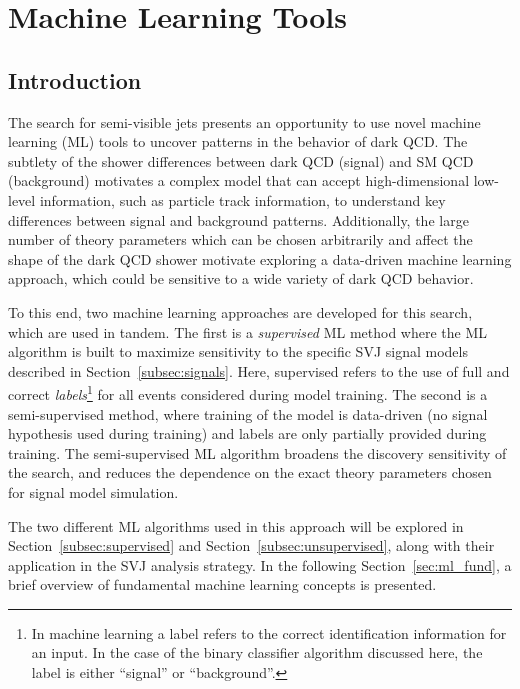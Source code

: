 \chapter{Machine Learning Tools}
\label{ch:ml_tools}

\section{Introduction}
The search for semi-visible jets presents an opportunity to use novel machine learning (ML) tools to uncover patterns in the behavior of dark QCD. The subtlety of the shower differences between dark QCD (signal) and SM QCD (background) motivates a complex model that can accept high-dimensional low-level information, such as particle track information, to understand key differences between signal and background patterns. Additionally, the large number of theory parameters which can be chosen arbitrarily and affect the shape of the dark QCD shower motivate exploring a data-driven machine learning approach, which could be sensitive to a wide variety of dark QCD behavior. \par

To this end, two machine learning approaches are developed for this search, which are used in tandem. The first is a \textit{supervised} ML method where the ML algorithm is built to maximize sensitivity to the specific SVJ signal models described in Section~\ref{subsec:signals}. Here, supervised refers to the use of full and correct \textit{labels}\footnote{In machine learning a label refers to the correct identification information for an input. In the case of the binary classifier algorithm discussed here, the label is either ``signal'' or ``background''.} for all events considered during model training. The second is a semi-supervised method, where training of the model is data-driven (no signal hypothesis used during training) and labels are only partially provided during training. The semi-supervised ML algorithm broadens the discovery sensitivity of the search, and reduces the dependence on the exact theory parameters chosen for signal model simulation. \par

The two different ML algorithms used in this approach will be explored in Section~\ref{subsec:supervised} and Section~\ref{subsec:unsupervised}, along with their application in the SVJ analysis strategy. In the following Section~\ref{sec:ml_fund}, a brief overview of fundamental machine learning concepts is presented.

